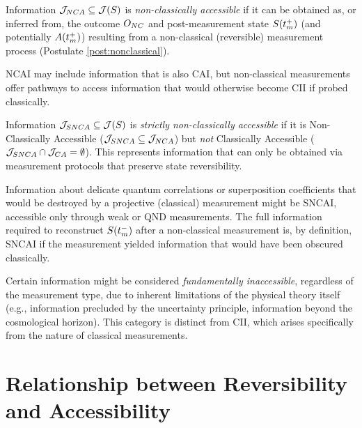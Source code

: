 	\begin{principle} \label{princ:NCAI}
		Information $\mathcal{J}_{NCA} \subseteq \mathcal{J}(S)$ is \emph{non-classically accessible} if it can be obtained as, or inferred from, the outcome $O_{NC}$ and post-measurement state $S(t_m^+)$ (and potentially $A(t_m^+)$) resulting from a non-classical (reversible) measurement process (Postulate \ref{post:nonclassical}).
	\end{principle}
	\begin{remark}
		NCAI may include information that is also CAI, but non-classical measurements offer pathways to access information that would otherwise become CII if probed classically.
	\end{remark}
	
	\begin{principle} \label{princ:SNCAI}
		Information $\mathcal{J}_{SNCA} \subseteq \mathcal{J}(S)$ is \emph{strictly non-classically accessible} if it is Non-Classically Accessible ($\mathcal{J}_{SNCA} \subseteq \mathcal{J}_{NCA}$) but \emph{not} Classically Accessible ($\mathcal{J}_{SNCA} \cap \mathcal{J}_{CA} = \emptyset$). This represents information that can only be obtained via measurement protocols that preserve state reversibility.
	\end{principle}
	\begin{example}
		Information about delicate quantum correlations or superposition coefficients that would be destroyed by a projective (classical) measurement might be SNCAI, accessible only through weak or QND measurements. The full information required to reconstruct $S(t_m^-)$ after a non-classical measurement is, by definition, SNCAI if the measurement yielded information that would have been obscured classically.
	\end{example}
	
	\begin{principle} \label{princ:FII}
		Certain information might be considered \emph{fundamentally inaccessible}, regardless of the measurement type, due to inherent limitations of the physical theory itself (e.g., information precluded by the uncertainty principle, information beyond the cosmological horizon). This category is distinct from CII, which arises specifically from the nature of classical measurements.
	\end{principle}
	
	
	\section{Relationship between Reversibility and Accessibility}
	
